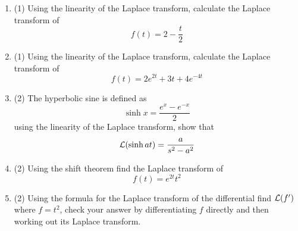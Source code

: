 \documentclass[12pt]{article}
\begin{document}
\renewcommand{\labelenumi}{\arabic{enumi}.}
\begin{enumerate}

\item (1) Using the linearity of the Laplace transform, calculate the
Laplace transform of
\begin{equation}
f(t)=2-\frac{t}{2}
\end{equation}

\item (1) Using the linearity of the Laplace transform, calculate the
Laplace transform of
\begin{equation}
f(t)=2e^{2t}+3t+4e^{-4t}
\end{equation}


\item (2)
The hyperbolic sine is defined as
\begin{equation}
\sinh{x}=\frac{e^x-e^{-x}}{2}
\end{equation}
using the linearity of the Laplace transform, show that
\begin{equation}
{\cal L}(\sinh{at})=\frac{a}{s^2-a^2}
\end{equation}

\item (2)
Using the shift theorem find the Laplace transform of
\begin{equation}
f(t)=e^{2t}t^2
\end{equation}

\item (2)
Using the formula for the Laplace transform of the differential find ${\cal L}(f')$ where $f=t^2$, check your answer by differentiating $f$ directly and then working out its Laplace transform.


\end{enumerate}

\vfill

\noindent
\end{document}

